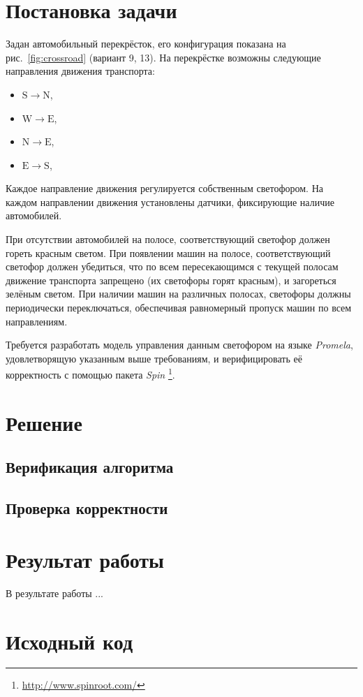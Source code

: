 \documentclass[a4paper,10pt]{article}
\begin{document}


\tableofcontents
\pagebreak


\section{Постановка задачи}
Задан автомобильный перекрёсток, его конфигурация показана на рис.~\ref{fig:crossroad} (вариант 9, 13).
На перекрёстке возможны следующие направления движения транспорта:
\begin{itemize}
  \item $\mathrm{S} \rightarrow \mathrm{N}$,
  \item $\mathrm{W} \rightarrow \mathrm{E}$,
  \item $\mathrm{N} \rightarrow \mathrm{E}$,
  \item $\mathrm{E} \rightarrow \mathrm{S}$,
\end{itemize}
Каждое направление движения регулируется собственным светофором.
На каждом направлении движения установлены датчики, фиксирующие наличие автомобилей.

При отсутствии автомобилей на полосе, соответствующий светофор должен гореть красным светом.
При появлении машин на полосе, соответствующий светофор должен убедиться, 
что по всем пересекающимся с текущей полосам движение транспорта запрещено 
(их светофоры горят красным), и загореться зелёным светом.
При наличии машин на различных полосах, светофоры должны периодически переключаться, 
обеспечивая равномерный пропуск машин по всем направлениям.

Требуется разработать модель управления данным светофором на языке \textit{Promela}, 
удовлетворящую указанным выше требованиям, 
и верифицировать её корректность с помощью пакета \textit{Spin}%
\footnote{\url{http://www.spinroot.com/}}.

\section{Решение}



\subsection{Верификация алгоритма}


\subsection{Проверка корректности}

\section{Результат работы}
В результате работы ...

\appendix
\section{Исходный код}





\end{document}
